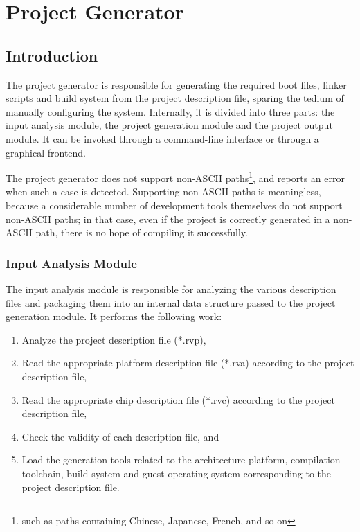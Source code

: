 \chapter{Project Generator}\label{ch:5-generator}


\section{Introduction}\label{sec:5-1}

The project generator is responsible for generating the required boot files, linker scripts and build system from the project description file, sparing the tedium of manually configuring the system. Internally, it is divided into three parts: the input analysis module, the project generation module and the project output module. It can be invoked through a command-line interface or through a graphical frontend.

The project generator does not support non-ASCII paths\footnote{such as paths containing Chinese, Japanese, French, and so on}, and reports an error when such a case is detected. Supporting non-ASCII paths is meaningless, because a considerable number of development tools themselves do not support non-ASCII paths; in that case, even if the project is correctly generated in a non-ASCII path, there is no hope of compiling it successfully.

\subsection{Input Analysis Module}\label{subsec:5-1-1}

The input analysis module is responsible for analyzing the various description files and packaging them into an internal data structure passed to the project generation module. It performs the following work:

\begin{enumerate}
\def\labelenumi{\arabic{enumi}.}
\item
  Analyze the project description file (*.rvp),
\item
  Read the appropriate platform description file (*.rva) according to the project description file,
\item
  Read the appropriate chip description file (*.rvc) according to the project description file,
\item
  Check the validity of each description file, and
\item
  Load the generation tools related to the architecture platform, compilation toolchain, build system and guest operating system corresponding to the project description file.
\end{enumerate}

